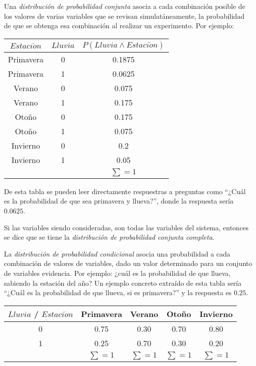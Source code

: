 Una \emph{distribución de probabilidad conjunta} asocia a cada combinación posible de los valores de varias variables que se revisan simulatáneamente, la probabilidad de que se obtenga esa combinación al realizar un experimento.  Por ejemplo:

\begin{center}
\begin{tabular}{cc|c}
 $Estaci\acute{o}n$ & $Lluvia$ & $P(Lluvia \land Estaci\acute{o}n)$ \\ \toprule
 Primavera & 0 & 0.1875 \\
 Primavera & 1 & 0.0625 \\
 Verano & 0 & 0.075 \\
 Verano & 1 & 0.175 \\
 Otoño & 0 & 0.175 \\
 Otoño & 1 & 0.075 \\
 Invierno & 0 & 0.2 \\
 Invierno & 1 & 0.05 \\
 \multicolumn{2}{c}{}  & $\sum=1$
\end{tabular}
\end{center}

De esta tabla se pueden leer directamente respuestras a preguntas como ``¿Cuál es la probabilidad de que sea primavera y llueva?'', donde la respuesta sería $0.0625$.

Si las variables siendo consideradas, son todas las variables del sistema, entonces se dice que se tiene la \emph{distribución de probabilidad conjunta completa}.

La \emph{distribución de probabilidad condicional} asocia una probabilidad a cada combinación de valores de variables, dado un valor determinado para un conjunto de variables evidencia.  Por ejemplo: ¿cuál es la probabilidad de que llueva, sabiendo la estación del año? Un ejemplo concreto extraído de esta tabla sería ``¿Cuál es la probabilidad de que llueva, si es primavera?'' y la respuesta es $0.25$.

\begin{center}
\begin{tabular}{c|cccc}
 $Lluvia$ / $Estaci\acute{o}n$ & Primavera & Verano & Otoño & Invierno \\ \toprule
 0 & 0.75 & 0.30 & 0.70 & 0.80 \\
 1 & 0.25 & 0.70 & 0.30 & 0.20 \\
 \multicolumn{1}{c}{}  & $\sum=1$ & $\sum=1$ & $\sum=1$ & $\sum=1$
\end{tabular}
\end{center}


